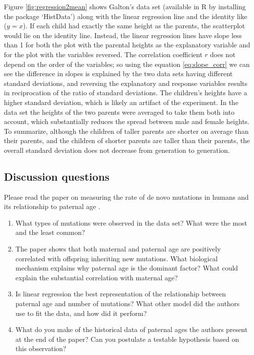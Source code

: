 \documentclass[
  letterpaper,
  DIV=11,
  numbers=noendperiod]{scrreprt}
\begin{document}
Figure \ref{fig:regression2mean} shows Galton's data set (available in R
by installing the package `HistData') along with the linear regression
line and the identity like (\(y=x\)). If each child had exactly the same
height as the parents, the scatterplot would lie on the identity line.
Instead, the linear regression lines have slope less than 1 for both the
plot with the parental heights as the explanatory variable and for the
plot with the variables reversed. The correlation coefficient \(r\) does
not depend on the order of the variables; so using the equation
\ref{eq:slope_corr} we can see the difference in slopes is explained by
the two data sets having different standard deviations, and reversing
the explanatory and response variables results in reciprocation of the
ratio of standard deviations. The children's heights have a higher
standard deviation, which is likely an artifact of the experiment. In
the data set the heights of the two parents were averaged to take them
both into account, which substantially reduces the spread between male
and female heights. To summarize, although the children of taller
parents are shorter on average than their parents, and the children of
shorter parents are taller than their parents, the overall standard
deviation does not decrease from generation to generation.

\hypertarget{discussion-questions-1}{%
\subsection{Discussion questions}\label{discussion-questions-1}}

Please read the paper on measuring the rate of
 de novo mutations in humans and its
relationship to paternal age \cite{kong_rate_2012}.

\begin{enumerate}
\def\labelenumi{\arabic{enumi}.}
\item
  What types of mutations were observed in the data set? What were the
  most and the least common?
\item
  The paper shows that both maternal and paternal age are positively
  correlated with offspring inheriting new mutations. What biological
  mechanism explains why paternal age is the dominant factor? What could
  explain the substantial correlation with maternal age?
\item
  Is linear regression the best representation of the relationship
  between paternal age and number of mutations? What other model did the
  authors use to fit the data, and how did it perform?
\item
  What do you make of the historical data of paternal ages the authors
  present at the end of the paper? Can you postulate a testable
  hypothesis based on this observation?
\end{enumerate}
\end{document}
